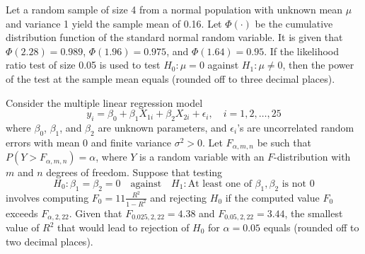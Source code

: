     \item Let a random sample of size 4 from a normal population with unknown mean $\mu$ and variance 1 yield the sample mean of 0.16. Let $\Phi(\cdot)$ be the cumulative distribution function of the standard normal random variable. It is given that $\Phi(2.28) = 0.989$, $\Phi(1.96) = 0.975$, and $\Phi(1.64) = 0.95$. If the likelihood ratio test of size 0.05 is used to test $H_0: \mu = 0$ against $H_1: \mu \neq 0$, then the power of the test at the sample mean equals  {\underline{\hspace{2cm}}}  (rounded off to three decimal places).

    \item Consider the multiple linear regression model
\[
    y_i = \beta_0 + \beta_1 X_{1i} + \beta_2 X_{2i} + \epsilon_i, \quad i = 1, 2, \dots, 25
\]
    where $\beta_0$, $\beta_1$, and $\beta_2$ are unknown parameters, and $\epsilon_i$'s are uncorrelated random errors with mean 0 and finite variance $\sigma^2 > 0$. Let $F_{\alpha, m, n}$ be such that $P(Y > F_{\alpha, m, n}) = \alpha$, where $Y$ is a random variable with an $F$-distribution with $m$ and $n$ degrees of freedom. Suppose that testing
\[
    H_0: \beta_1 = \beta_2 = 0 \quad \text{against} \quad H_1: \text{At least one of } \beta_1, \beta_2 \text{ is not 0}
\]
    involves computing $F_0 = 11\frac{R^2}{1 - R^2}$ and rejecting $H_0$ if the computed value $F_0$ exceeds $F_{\alpha, 2, 22}$. Given that $F_{0.025, 2, 22} = 4.38$ and $F_{0.05, 2, 22} = 3.44$, the smallest value of $R^2$ that would lead to rejection of $H_0$ for $\alpha = 0.05$ equals  {\underline{\hspace{2cm}}}  (rounded off to two decimal places).

